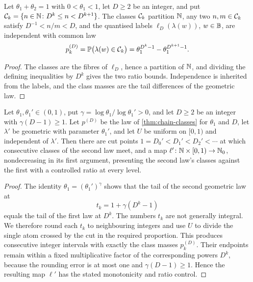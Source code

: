 \begin{lemma}
\label{thm:chain-classes}
\leanok
Let $\theta_1+\theta_2=1$ with $0<\theta_1<1$, let $D\geq2$ be an integer, and put
$\mathcal{C}_k=\{n\in\mathbb{N}\colon D^k\leq n<D^{k+1}\}$. The classes $\mathcal{C}_k$ partition $\mathbb{N}$, any two
$n,m\in\mathcal{C}_k$ satisfy $D^{-1}<n/m<D$, and the quantised labels $\ell_D(\lambda(w))$,
$w\in\mathbb{B}$, are independent with common law
\[
 p^{(D)}_k=\mathbb{P}\bigl(\lambda(w)\in\mathcal{C}_k\bigr)=\theta_1^{D^k-1}-\theta_1^{D^{k+1}-1}.
\]
\end{lemma}

\begin{proof}
\leanok
{}
The classes are the fibres of $\ell_D$, hence a partition of $\mathbb{N}$, and dividing the
defining inequalities by $D^k$ gives the two ratio bounds. Independence is inherited from the
labels, and the class masses are the tail differences of the geometric law.
\end{proof}

\begin{lemma}
\label{thm:chain-coupling}
\leanok
Let $\theta_1,\theta_1'\in(0,1)$, put $\gamma=\log\theta_1/\log\theta_1'>0$, and let $D\geq2$
be an integer with $\gamma(D-1)\geq1$. Let $p^{(D)}$ be the law of \cref{thm:chain-classes} for
$\theta_1$ and $D$, let $\lambda'$ be geometric with parameter $\theta_1'$, and let $U$ be
uniform on $[0,1)$ and independent of $\lambda'$. Then there are cut points
$1=D_0'<D_1'<D_2'<\cdots$ at which consecutive classes of the second law meet, and a map
$\ell'\colon\mathbb{N}\times[0,1)\to\mathbb{N}_0$, nondecreasing in its first argument, presenting the
second law's classes against the first with a controlled ratio at every level.
\end{lemma}

\begin{proof}
\leanok
{}
The identity $\theta_1=(\theta_1')^\gamma$ shows that the tail of the second geometric law at
\[
 t_k=1+\gamma(D^k-1)
\]
equals the tail of the first law at $D^k$. The numbers $t_k$ are not generally integral. We
therefore round each $t_k$ to neighbouring integers and use $U$ to divide the single atom crossed
by the cut in the required proportion. This produces consecutive integer intervals with exactly
the class masses $p^{(D)}_k$. Their endpoints remain within a fixed multiplicative factor of the
corresponding powers $D^k$, because the rounding error is at most one and
$\gamma(D-1)\geq1$. Hence the resulting map $\ell'$ has the stated monotonicity and ratio
control.
\end{proof}

